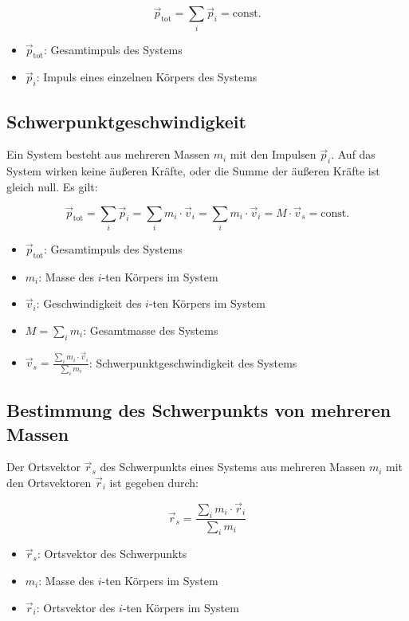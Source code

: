 \documentclass[a4paper, 8pt]{extarticle}
\begin{document}
\begin{landscape}
\begin{multicols*}{3}
\[
\vec{p}_{\text{tot}} = \sum_i \vec{p}_i = \text{const.}
\]

\begin{itemize}
    \item \( \vec{p}_{\text{tot}} \): Gesamtimpuls des Systems
    \item \( \vec{p}_i \): Impuls eines einzelnen Körpers des Systems
\end{itemize}


\subsection{ Schwerpunktgeschwindigkeit}

Ein System besteht aus mehreren Massen \( m_i \) mit den Impulsen \( \vec{p}_i \). Auf das System wirken keine äußeren Kräfte, oder die Summe der äußeren Kräfte ist gleich null. Es gilt:

\[
\vec{p}_{\text{tot}} = \sum_i \vec{p}_i = \sum_i m_i \cdot \vec{v}_i = \sum_i m_i \cdot \vec{v}_i = M \cdot \vec{v}_s = \text{const.}
\]

\begin{itemize}
    \item \( \vec{p}_{\text{tot}} \): Gesamtimpuls des Systems
    \item \( m_i \): Masse des \( i \)-ten Körpers im System
    \item \( \vec{v}_i \): Geschwindigkeit des \( i \)-ten Körpers im System
    \item \( M = \sum_i m_i \): Gesamtmasse des Systems
    \item \( \vec{v}_s = \frac{\sum_i m_i \cdot \vec{v}_i}{\sum_i m_i} \): Schwerpunktgeschwindigkeit des Systems
\end{itemize}

\subsection{ Bestimmung des Schwerpunkts von mehreren Massen}

Der Ortsvektor \( \vec{r}_s \) des Schwerpunkts eines Systems aus mehreren Massen \( m_i \) mit den Ortsvektoren \( \vec{r}_i \) ist gegeben durch:

\[
\vec{r}_s = \frac{\sum_i m_i \cdot \vec{r}_i}{\sum_i m_i}
\]

\begin{itemize}
    \item \( \vec{r}_s \): Ortsvektor des Schwerpunkts
    \item \( m_i \): Masse des \( i \)-ten Körpers im System
    \item \( \vec{r}_i \): Ortsvektor des \( i \)-ten Körpers im System
\end{itemize}


\end{multicols*}
\end{landscape}
\end{document}
